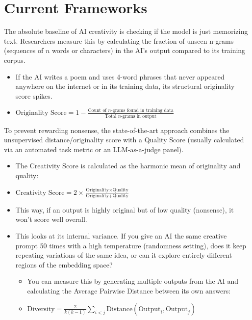 \documentclass{article}
\begin{document}
\section{Current Frameworks}
\begin{describe}
    \item[N-Gram Originality vs. Training Data] The absolute baseline of AI creativity is checking if the model is just memorizing text. Researchers measure this by calculating the fraction of unseen n-grams (sequences of $n$ words or characters) in the AI's output compared to its training corpus.
    \begin{itemize}
        \item If the AI writes a poem and uses 4-word phrases that never appeared anywhere on the internet or in its training data, its structural originality score spikes.
        \item $\text{Originality Score} = 1 - \frac{\text{Count of } n\text{-grams found in training data}}{\text{Total } n\text{-grams in output}}$
    \end{itemize}
    \item[The Creativity Frontier: The Harmonic Mean] To prevent rewarding nonsense, the state-of-the-art approach combines the unsupervised distance/originality score with a Quality Score (usually calculated via an automated task metric or an LLM-as-a-judge panel).
    \begin{itemize}
        \item The Creativity Score is calculated as the harmonic mean of originality and quality:
        \item $\text{Creativity Score} = 2 \times \frac{\text{Originality} \times \text{Quality}}{\text{Originality} + \text{Quality}}$
        \item This way, if an output is highly original but of low quality (nonsense), it won't score well overall.
    \item[Self-Similarity and "Intra-Model" Diversity] This looks at its internal variance. If you give an AI the same creative prompt 50 times with a high temperature (randomness setting), does it keep repeating variations of the same idea, or can it explore entirely different regions of the embedding space?
    \begin{itemize}
        \item You can measure this by generating multiple outputs from the AI and calculating the Average Pairwise Distance between its own answers:
        \item $\text{Diversity} = \frac{2}{k(k-1)} \sum_{i < j} \text{Distance}(\text{Output}_i, \text{Output}_j)$

\end{itemize}
\end{itemize}
\end{describe}
\end{document}
